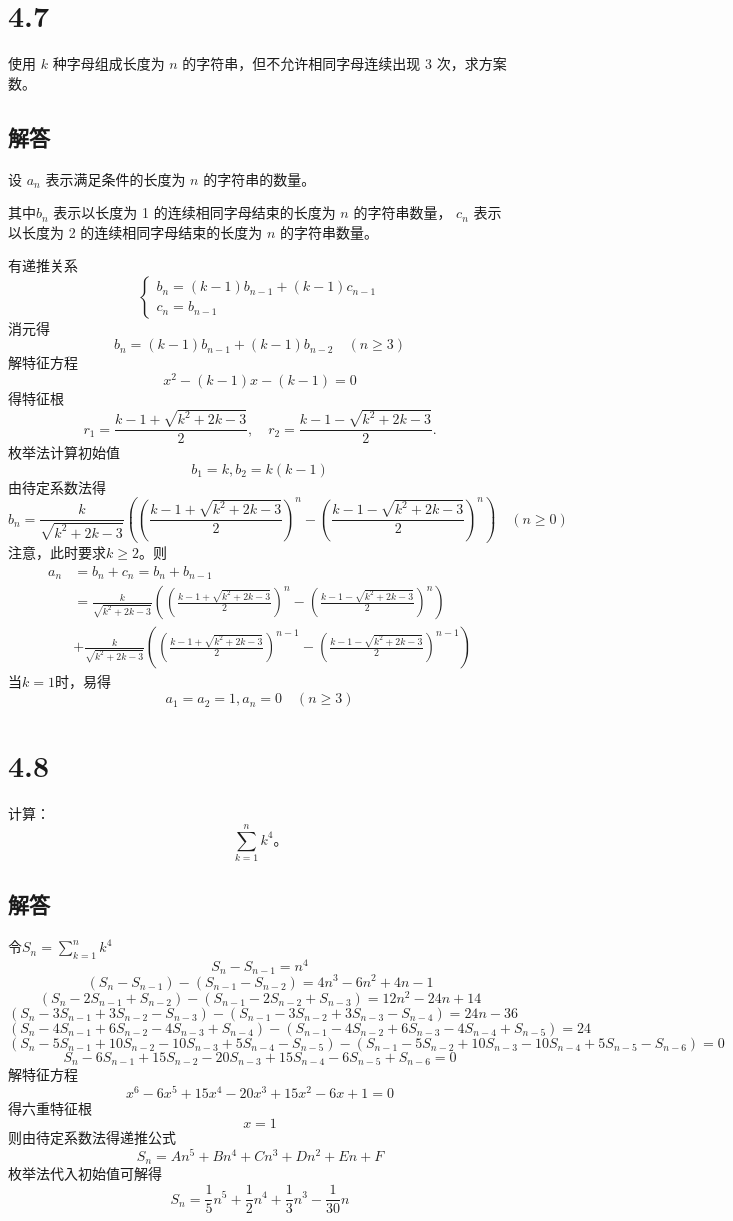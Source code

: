 \documentclass[12pt]{article}
\begin{document}
\section*{4.7}
使用 \( k \) 种字母组成长度为 \( n \) 的字符串，但不允许相同字母连续出现 3 次，求方案数。
\subsection*{解答}
设 \( a_n \) 表示满足条件的长度为 \( n \) 的字符串的数量。

其中\( b_n \) 表示以长度为 1 的连续相同字母结束的长度为 \( n \) 的字符串数量，
\( c_n \) 表示以长度为 2 的连续相同字母结束的长度为 \( n \) 的字符串数量。

有递推关系
\[
\begin{cases}
b_n=(k-1)b_{n-1}+(k-1)c_{n-1} \\
c_n=b_{n-1}
\end{cases}
\]
消元得
\[b_n=(k-1)b_{n-1}+(k-1)b_{n-2} \quad (n \geq 3)\]
解特征方程
\[x^2 - (k-1)x - (k-1) = 0\]
得特征根
\[
r_1 = \frac{k-1+\sqrt{k^2+2k-3}}{2}, \quad r_2 = \frac{k-1-\sqrt{k^2+2k-3}}{2}.
\]
枚举法计算初始值
\[b_1=k, b_2=k(k-1)\]
由待定系数法得
\[
b_n = \frac{k}{\sqrt{k^2+2k-3}} \left( \left( \frac{k-1+\sqrt{k^2+2k-3}}{2} \right)^n - \left( \frac{k-1-\sqrt{k^2+2k-3}}{2} \right)^n \right) \quad (n \geq 0)
\]
注意，此时要求$k\geq2$。则
\begin{align}
a_n&=b_n+c_n=b_n+b_{n-1}\\
&=\frac{k}{\sqrt{k^2+2k-3}} \left( \left( \frac{k-1+\sqrt{k^2+2k-3}}{2} \right)^n - \left( \frac{k-1-\sqrt{k^2+2k-3}}{2} \right)^n \right)  \\
&+ \frac{k}{\sqrt{k^2+2k-3}} \left( \left( \frac{k-1+\sqrt{k^2+2k-3}}{2} \right)^{n-1} - \left( \frac{k-1-\sqrt{k^2+2k-3}}{2} \right)^{n-1} \right)
\end{align}
当$k=1$时，易得
\[a_1=a_2=1, a_n=0 \quad (n\geq3)\]


\section*{4.8}
计算：
\[
\sum_{k=1}^n k^4。
\]
\subsection*{解答}
令$S_n=\sum_{k=1}^n k^4$
\[S_n-S_{n-1}=n^4\]
\[
(S_n - S_{n-1})-(S_{n-1} - S_{n-2}) = 4n^3 - 6n^2 + 4n - 1
\]
\[
(S_n - 2S_{n-1} + S_{n-2}) - (S_{n-1} - 2S_{n-2} + S_{n-3}) = 12n^2 - 24n + 14
\]
\[
(S_n - 3S_{n-1} + 3S_{n-2} - S_{n-3}) - (S_{n-1} - 3S_{n-2} + 3S_{n-3} - S_{n-4}) = 24n - 36
\]
\[
(S_n - 4S_{n-1} + 6S_{n-2} - 4S_{n-3} + S_{n-4}) - (S_{n-1} - 4S_{n-2} + 6S_{n-3} - 4S_{n-4} + S_{n-5}) = 24
\]
\[
(S_n - 5S_{n-1} + 10S_{n-2} - 10S_{n-3} + 5S_{n-4} - S_{n-5})-(S_{n-1} - 5S_{n-2} + 10S_{n-3} - 10S_{n-4} + 5S_{n-5} - S_{n-6}) = 0
\]
\[
S_n - 6S_{n-1} + 15S_{n-2} - 20S_{n-3} + 15S_{n-4} - 6S_{n-5} + S_{n-6} = 0
\]
解特征方程
\[x^6 - 6x^5 + 15x^4 -20x^3 + 15x^2 - 6x + 1= 0\]
得六重特征根
\[x=1\]
则由待定系数法得递推公式
\[
S_n = An^5 + Bn^4 + Cn^3 + Dn^2 + En + F
\]
枚举法代入初始值可解得
\[
S_n = \frac{1}{5}n^5 + \frac{1}{2}n^4 + \frac{1}{3}n^3 - \frac{1}{30}n
\]
\end{document}
